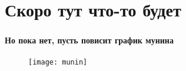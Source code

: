 
\frame[plain]{\titlepage} %


\section{Скоро тут что-то будет}

\begin{frame}
\frametitle{\insertsection}
\framesubtitle{Но пока нет, пусть повисит график мунина}
\begin{figure}[h]
	\center
	\texttt{[image: munin]}
\end{figure}
\end{frame}

